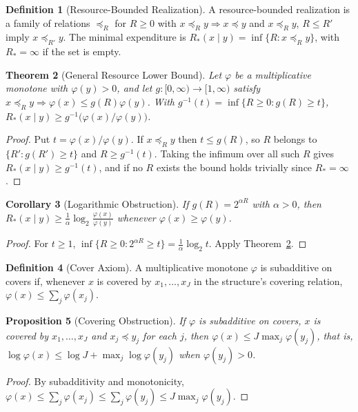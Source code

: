 \documentclass[11pt,letterpaper]{report}
\theoremstyle{plain}
\newtheorem{theorem}{Theorem}[chapter]
\newtheorem{proposition}[theorem]{Proposition}
\newtheorem{corollary}[theorem]{Corollary}
\theoremstyle{definition}
\newtheorem{definition}[theorem]{Definition}
\theoremstyle{remark}
\begin{document}
\begin{definition}[Resource-Bounded Realization]\label{def:resbounded}
A resource-bounded realization is a family of relations $\preceq_R$ for $R\ge0$ with $x\preceq_Ry\Rightarrow x\preceq y$ and $x\preceq_Ry$, $R\le R'$ imply $x\preceq_{R'}y$. The minimal expenditure is $R_*(x\mid y)=\inf\{R:x\preceq_Ry\}$, with $R_*=\infty$ if the set is empty.
\end{definition}

\begin{theorem}[General Resource Lower Bound]\label{th:resbound}
Let $\varphi$ be a multiplicative monotone with $\varphi(y)>0$, and let $g:[0,\infty)\to[1,\infty)$ satisfy $x\preceq_Ry\Rightarrow\varphi(x)\le g(R)\varphi(y)$. With $g^{-1}(t)=\inf\{R\ge0:g(R)\ge t\}$, $R_*(x\mid y)\ge g^{-1}\bigl(\varphi(x)/\varphi(y)\bigr)$.
\end{theorem}
\begin{proof}
Put $t=\varphi(x)/\varphi(y)$. If $x\preceq_Ry$ then $t\le g(R)$, so $R$ belongs to $\{R':g(R')\ge t\}$ and $R\ge g^{-1}(t)$. Taking the infimum over all such $R$ gives $R_*(x\mid y)\ge g^{-1}(t)$, and if no $R$ exists the bound holds trivially since $R_*=\infty$.
\end{proof}

\begin{corollary}[Logarithmic Obstruction]\label{co:logobstruction}
If $g(R)=2^{\alpha R}$ with $\alpha>0$, then $R_*(x\mid y)\ge\frac1\alpha\log_2\frac{\varphi(x)}{\varphi(y)}$ whenever $\varphi(x)\ge\varphi(y)$.
\end{corollary}
\begin{proof}
For $t\ge1$, $\inf\{R\ge0:2^{\alpha R}\ge t\}=\frac1\alpha\log_2t$. Apply Theorem~\ref{th:resbound}.
\end{proof}

\begin{definition}[Cover Axiom]\label{def:coveraxiom}
A multiplicative monotone $\varphi$ is subadditive on covers if, whenever $x$ is covered by $x_1,\dots,x_J$ in the structure's covering relation, $\varphi(x)\le\sum_j\varphi(x_j)$.
\end{definition}

\begin{proposition}[Covering Obstruction]\label{pr:covering}
If $\varphi$ is subadditive on covers, $x$ is covered by $x_1,\dots,x_J$ and $x_j\preceq y_j$ for each $j$, then $\varphi(x)\le J\max_j\varphi(y_j)$, that is, $\log\varphi(x)\le\log J+\max_j\log\varphi(y_j)$ when $\varphi(y_j)>0$.
\end{proposition}
\begin{proof}
By subadditivity and monotonicity, $\varphi(x)\le\sum_j\varphi(x_j)\le\sum_j\varphi(y_j)\le J\max_j\varphi(y_j)$.
\end{proof}
\end{document}
